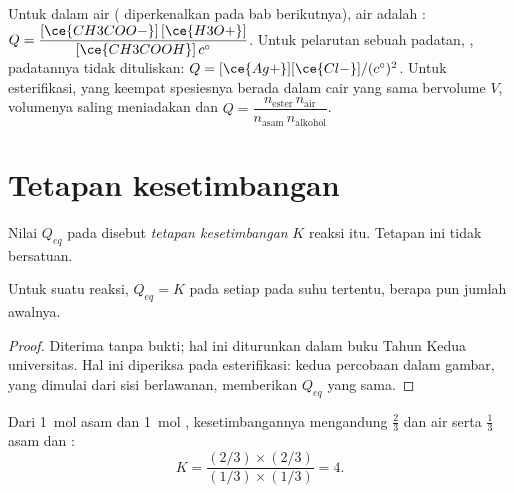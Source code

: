 \begin{example}\label{ex:g12:equilibrium:quotients}
Untuk  dalam air ( 
diperkenalkan pada bab berikutnya), air adalah :
$Q = \dfrac{[\ce{CH3COO-}]\,[\ce{H3O+}]}{[\ce{CH3COOH}]\,c^\circ}$.
Untuk pelarutan sebuah padatan, , padatannya
tidak dituliskan: $Q = [\ce{Ag+}][\ce{Cl-}]/(c^\circ)^2$. Untuk
esterifikasi, yang keempat spesiesnya berada dalam  cair yang
sama bervolume $V$, volumenya saling meniadakan dan
$Q = \dfrac{n_{\text{ester}}\, n_{\text{air}}}{n_{\text{asam}}\, n_{\text{alkohol}}}$.
\end{example}

\section{Tetapan kesetimbangan}

\begin{definition}\label{def:g12:equilibrium:constant}
Nilai $Q_{eq}$  pada  disebut
\emph{tetapan kesetimbangan} $K$ reaksi
itu. Tetapan ini tidak bersatuan.
\end{definition}

\begin{proposition}\label{prop:g12:equilibrium:constant}
Untuk suatu reaksi, $Q_{eq} = K$ pada setiap  pada
suhu tertentu, berapa pun jumlah awalnya.
\end{proposition}

\begin{proof}
Diterima tanpa bukti; hal ini diturunkan dalam buku Tahun Kedua
universitas. Hal ini diperiksa pada esterifikasi: kedua percobaan dalam
gambar, yang dimulai dari sisi berlawanan, memberikan $Q_{eq}$ yang
sama.
\end{proof}

\begin{example}[$K$ esterifikasi]\label{ex:g12:equilibrium:k-ester}
Dari \qty{1}{mol} asam dan \qty{1}{mol} , kesetimbangannya
mengandung $\frac{2}{3}$   dan air serta $\frac{1}{3}$  asam
dan :
\[
  K = \frac{(2/3)\times(2/3)}{(1/3)\times(1/3)} = 4 .
\]
\end{example}

